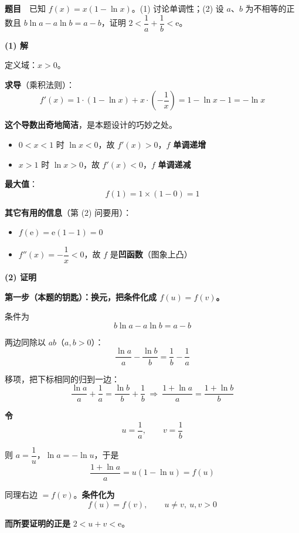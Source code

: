 \par\medskip


\textbf{题目}　已知 $f(x)=x(1-\ln x)$。(1) 讨论单调性；(2) 设 $a$、$b$ 为不相等的正数且 $b\ln a-a\ln b=a-b$，证明 $2<\dfrac1a+\dfrac1b<\mathrm e$。

\par\medskip

\textbf{(1) 解}

定义域：$x>0$。

\textbf{求导}（乘积法则）：
\[f'(x)=1\cdot(1-\ln x)+x\cdot\left(-\frac1x\right)=1-\ln x-1=-\ln x\]

\textbf{这个导数出奇地简洁}，是本题设计的巧妙之处。

\begin{itemize}
\item $0<x<1$ 时 $\ln x<0$，故 $f'(x)>0$，$f$ \textbf{单调递增}
\item $x>1$ 时 $\ln x>0$，故 $f'(x)<0$，$f$ \textbf{单调递减}
\end{itemize}

\textbf{最大值}：
\[f(1)=1\times(1-0)=1\]

\textbf{其它有用的信息}（第 (2) 问要用）：
\begin{itemize}
\item $f(\mathrm e)=\mathrm e(1-1)=0$
\item $f''(x)=-\dfrac1x<0$，故 $f$ 是\textbf{凹函数}（图象上凸）
\end{itemize}

\par\medskip

\textbf{(2) 证明}

\textbf{第一步（本题的钥匙）：换元，把条件化成 $f(u)=f(v)$。}

条件为
\[b\ln a-a\ln b=a-b\]

两边同除以 $ab$（$a,b>0$）：
\[\frac{\ln a}a-\frac{\ln b}b=\frac1b-\frac1a\]

移项，把下标相同的归到一边：
\[\frac{\ln a}a+\frac1a=\frac{\ln b}b+\frac1b\ \Longrightarrow\ \frac{1+\ln a}a=\frac{1+\ln b}b\]

\textbf{令}
\[u=\frac1a,\qquad v=\frac1b\]

则 $a=\dfrac1u$，$\ln a=-\ln u$，于是
\[\frac{1+\ln a}a=u\left(1-\ln u\right)=f(u)\]

同理右边 $=f(v)$。\textbf{条件化为}
\[\boxed{f(u)=f(v),\qquad u\ne v,\ u,v>0}\]

\textbf{而所要证明的正是} $2<u+v<\mathrm e$。

